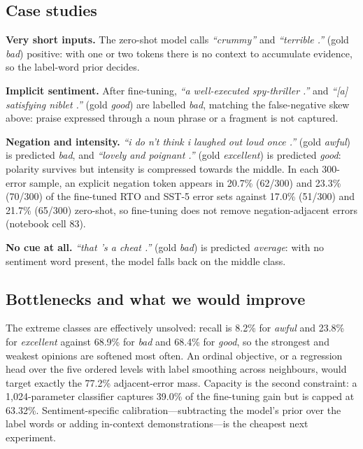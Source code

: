 \documentclass[11pt]{article}
\begin{document}
\subsection{Case studies}
\textbf{Very short inputs.} The zero-shot model calls \textit{``crummy''} and \textit{``terrible
.''} (gold \emph{bad}) positive: with one or two tokens there is no context to accumulate
evidence, so the label-word prior decides.

\textbf{Implicit sentiment.} After fine-tuning, \textit{``a well-executed spy-thriller .''} and
\textit{``[a] satisfying niblet .''} (gold \emph{good}) are labelled \emph{bad}, matching the
false-negative skew above: praise expressed through a noun phrase or a fragment is not captured.

\textbf{Negation and intensity.} \textit{``i do n't think i laughed out loud once .''} (gold
\emph{awful}) is predicted \emph{bad}, and \textit{``lovely and poignant .''} (gold
\emph{excellent}) is predicted \emph{good}: polarity survives but intensity is compressed
towards the middle. In each 300-error sample, an explicit negation token appears in 20.7\% (62/300) and 23.3\% (70/300) of
the fine-tuned RTO and SST-5 error sets against 17.0\% (51/300) and 21.7\% (65/300) zero-shot, so
fine-tuning does not remove negation-adjacent errors (notebook cell 83).

\textbf{No cue at all.} \textit{``that 's a cheat .''} (gold \emph{bad}) is predicted
\emph{average}: with no sentiment word present, the model falls back on the middle
class.

\subsection{Bottlenecks and what we would improve}
The extreme classes are effectively unsolved: recall is 8.2\% for \emph{awful} and 23.8\% for
\emph{excellent} against 68.9\% for \emph{bad} and 68.4\% for \emph{good}, so the strongest and
weakest opinions are softened most often. An ordinal objective, or a regression head
over the five ordered levels with label smoothing across neighbours, would target exactly the
77.2\% adjacent-error mass. Capacity is the second constraint: a 1{,}024-parameter classifier
captures 39.0\% of the fine-tuning gain but is capped at 63.32\%. Sentiment-specific
calibration---subtracting the model's prior over the label words or adding in-context
demonstrations---is the cheapest next experiment.
\end{document}
